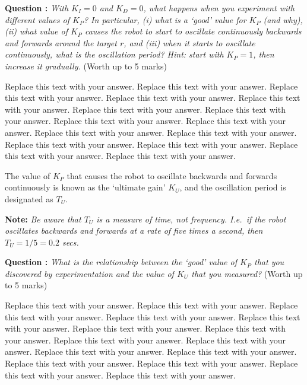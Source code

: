\documentclass[hidelinks,a4paper,11pt]{article}
\newcounter{question}
\newcommand\myq{\refstepcounter{question}\thequestion}
\begin{document}
{\bfseries Question \myq:}  \emph{With $K_I=0$ and $K_D=0$, what happens when you experiment with different values of $K_P$?  In particular, (i) what is a `good' value for $K_P$ (and why), (ii) what value of $K_P$ causes the robot to start to oscillate continuously backwards and forwards around the target $r$, and (iii) when it starts to oscillate continuously, what is the oscillation period?  Hint: start with $K_P =1$, then increase it gradually.} (Worth up to 5 marks)\\
\begin{mdframed}
Replace this text with your answer.  Replace this text with your answer.  Replace this text with your answer.  Replace this text with your answer.  Replace this text with your answer.  Replace this text with your answer.  Replace this text with your answer.  Replace this text with your answer.  Replace this text with your answer.  Replace this text with your answer.  Replace this text with your answer.  Replace this text with your answer.  Replace this text with your answer.  Replace this text with your answer.  Replace this text with your answer.
\end{mdframed}
\vspace*{\baselineskip}

The value of $K_P$ that causes the robot to oscillate backwards and forwards continuously is known as the `ultimate gain' $K_U$, and the oscillation period is designated as $T_U$.

{\bfseries Note:}  \emph{Be aware that $T_U$ is a measure of time, not frequency.  I.e.\ if the robot oscillates backwards and forwards at a rate of five times a second, then $T_U=1/5=0.2$ secs.}

{\bfseries Question \myq:}  \emph{What is the relationship between the `good' value of $K_P$ that you discovered by experimentation and the value of $K_U$ that you measured?} (Worth up to 5 marks)\\
\begin{mdframed}
Replace this text with your answer.  Replace this text with your answer.  Replace this text with your answer.  Replace this text with your answer.  Replace this text with your answer.  Replace this text with your answer.  Replace this text with your answer.  Replace this text with your answer.  Replace this text with your answer.  Replace this text with your answer.  Replace this text with your answer.  Replace this text with your answer.  Replace this text with your answer.  Replace this text with your answer.  Replace this text with your answer.
\end{mdframed}
\vspace*{\baselineskip}
\end{document}
